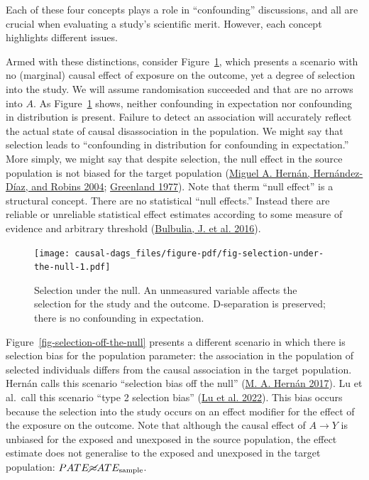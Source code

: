 \documentclass[
  singlecolumn]{report}
\begin{document}
Each of these four concepts plays a role in ``confounding'' discussions,
and all are crucial when evaluating a study's scientific merit. However,
each concept highlights different issues.

Armed with these distinctions, consider
Figure~\ref{fig-selection-under-the-null}, which presents a scenario
with no (marginal) causal effect of exposure on the outcome, yet a
degree of selection into the study. We will assume randomisation
succeeded and that are no arrows into \(A\). As
Figure~\ref{fig-selection-under-the-null} shows, neither confounding in
expectation nor confounding in distribution is present. Failure to
detect an association will accurately reflect the actual state of causal
disassociation in the population. We might say that selection leads to
``confounding in distribution for confounding in expectation.'' More
simply, we might say that despite selection, the null effect in the
source population is not biased for the target population
(\protect\hyperlink{ref-hernuxe1n2004}{Miguel A. Hernán, Hernández-Díaz,
and Robins 2004}; \protect\hyperlink{ref-greenland1977}{Greenland
1977}). Note that therm ``null effect'' is a structural concept. There
are no statistical ``null effects.'' Instead there are reliable or
unreliable statistical effect estimates according to some measure of
evidence and arbitrary threshold
(\protect\hyperlink{ref-bulbuliaj.2016}{Bulbulia, J. et al. 2016}).

\begin{figure}

{\centering \texttt{[image: causal-dags\_files/figure-pdf/fig-selection-under-the-null-1.pdf]}

}

\caption{\label{fig-selection-under-the-null}Selection under the null.
An unmeasured variable affects the selection for the study and the
outcome. D-separation is preserved; there is no confounding in
expectation.}

\end{figure}

Figure~\ref{fig-selection-off-the-null} presents a different scenario in
which there is selection bias for the population parameter: the
association in the population of selected individuals differs from the
causal association in the target population. Hernán calls this scenario
``selection bias off the null''
(\protect\hyperlink{ref-hernuxe1n2017}{M. A. Hernán 2017}). Lu et
al.~call this scenario ``type 2 selection bias''
(\protect\hyperlink{ref-lu2022}{Lu et al. 2022}). This bias occurs
because the selection into the study occurs on an effect modifier for
the effect of the exposure on the outcome. Note that although the causal
effect of \(A\to Y\) is unbiased for the exposed and unexposed in the
source population, the effect estimate does not generalise to the
exposed and unexposed in the target population:
\(PATE \cancel{\approx} ATE_{\text{sample}}\).
\end{document}
